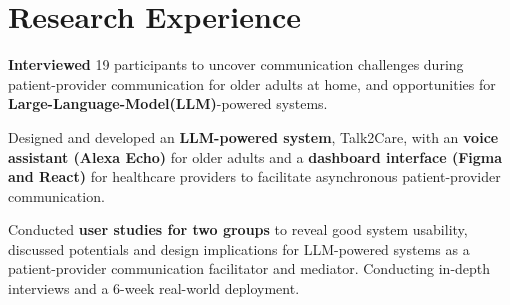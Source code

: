 
\section{\textbf{Research Experience}}
  \resumeSubHeadingListStart
    \vspace{-1.0mm}
      \resumeItemListStart

         \item \textbf{Interviewed} 19 participants to uncover communication challenges during patient-provider communication for older adults at home, and opportunities for \textbf{Large-Language-Model(LLM)}-powered systems.
        \item Designed and developed an \textbf{LLM-powered system}, Talk2Care,  with an \textbf{voice assistant (Alexa Echo)} for older adults and a \textbf{dashboard interface (Figma and React)} for healthcare providers to facilitate asynchronous patient-provider communication.
        \item Conducted \textbf{user studies for two groups} to reveal good system usability, discussed potentials and design implications for LLM-powered systems as a patient-provider communication facilitator and mediator. Conducting in-depth interviews and a 6-week real-world deployment.
      \resumeItemListEnd


